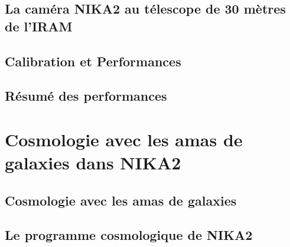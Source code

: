 \documentclass[a4paper, 11pt]{report}
\begin{document}
\chapter{La caméra NIKA2 au télescope de 30 mètres de l'IRAM}
\label{chap:nika2iram}

%
%   
%
\chapter{Calibration et Performances}
\label{chap:calib_perf}


%
%   
%
\chapter{Résumé des performances}
\label{chap:nika2_resume}


%
%
%
%
%
%
%

\part{Cosmologie avec les amas de galaxies dans NIKA2}

%
%
\chapter{Cosmologie avec les amas de galaxies}
\label{se:cosmo_general}



%
%
\chapter{Le programme cosmologique de NIKA2}
\label{se:cosmo_NIKA2}

\end{document}
